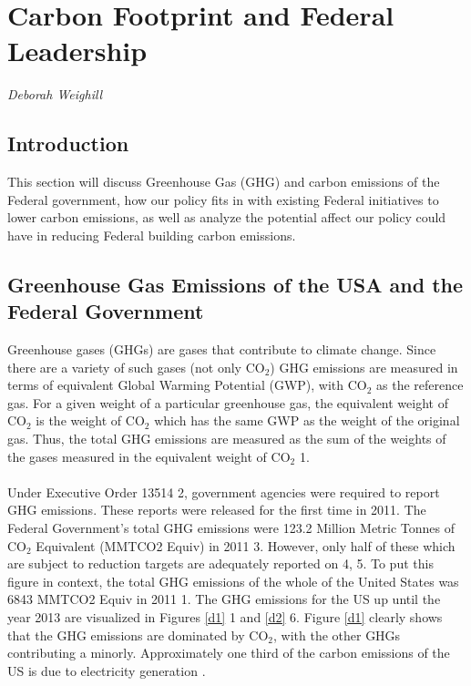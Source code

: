 \section{Carbon Footprint and Federal Leadership}
\textit{Deborah Weighill}

\subsection{Introduction}
This section will discuss Greenhouse Gas (GHG) and carbon emissions of the Federal government, how our policy fits in with existing Federal initiatives to lower carbon emissions, as well as analyze the potential affect our policy could have in reducing Federal building carbon emissions.

\subsection{Greenhouse Gas Emissions of the USA and the Federal Government}
Greenhouse gases (GHGs) are gases that contribute to climate change. Since there are a variety of such gases (not only CO$_{2}$) GHG emissions are measured in terms of equivalent Global Warming Potential (GWP), with CO$_{2}$ as the reference gas. For a given weight of a particular greenhouse gas, the equivalent weight of CO$_{2}$ is the weight of CO$_{2}$ which has the same GWP as the weight of the original gas. Thus, the total GHG emissions are measured as the sum of the weights of the gases measured in the equivalent weight of CO$_{2}$ \cite{debbie}{1}.
\\\\
\noindent Under Executive Order 13514 \cite{debbie}{2}, government agencies were required to report GHG emissions. These reports were released for the first time in 2011. The Federal Government's total GHG emissions were 123.2 Million Metric Tonnes of CO$_{2}$ Equivalent (MMTCO2 Equiv) in 2011 \cite{debbie}{3}. However, only half of these which are subject to reduction targets are adequately reported on \cite{debbie}{4, 5}. To put this figure in context, the total GHG emissions of the whole of the United States was 6843 MMTCO2 Equiv in 2011 \cite{debbie}{1}. The GHG emissions for the US up until the year 2013 are visualized in Figures \ref{d1} \cite{debbie}{1} and \ref{d2} \cite{debbie}{6}. Figure \ref{d1} clearly shows that the GHG emissions are dominated by CO$_{2}$, with the other GHGs contributing a minorly. Approximately one third of the carbon emissions of the US is due to electricity generation \cite{newfigsepa2}.

